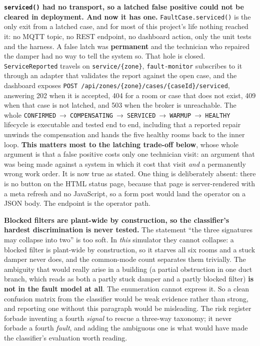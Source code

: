 \textbf{\texttt{serviced()} had no transport, so a latched false positive could not be cleared in
deployment. And now it has one.} \texttt{FaultCase.serviced()} is the only exit from a latched
case, and for most of this project's life nothing reached it: no MQTT topic, no REST endpoint, no
dashboard action, only the unit tests and the harness. A false latch was \textbf{permanent} and the
technician who repaired the damper had no way to tell the system so. That hole is closed.
\texttt{ServiceReported} travels on \texttt{service/\{zone\}}, \texttt{fault-monitor} subscribes to
it through an adapter that validates the report against the open case, and the dashboard exposes
\texttt{POST /api/zones/\allowbreak \{zone\}/cases/\allowbreak \{caseId\}/serviced}, answering 202 when it is accepted, 404
for a room or case that does not exist, 409 when that case is not latched, and 503 when the broker
is unreachable. The whole
\texttt{CONFIRMED}~→~\texttt{COMPENSATING}~→~\texttt{SERVICED}~→~\texttt{WARMUP}~→~\texttt{HEALTHY}
lifecycle is executable and tested end to end, including that a reported repair unwinds the
compensation and hands the five healthy rooms back to the inner loop. \textbf{This matters most to
the latching trade-off below}, whose whole argument is that a false positive costs only one
technician visit: an argument that was being made against a system in which it cost that visit
\emph{and} a permanently wrong work order. It is now true as stated. One thing is deliberately
absent: there is no button on the HTML status page, because that page is server-rendered with a
meta refresh and no JavaScript, so a form post would land the operator on a JSON body. The endpoint
is the operator path.

\textbf{Blocked filters are plant-wide by construction, so the classifier's hardest discrimination
is never tested.} The statement ``the three signatures may collapse into two'' is too soft. In
\emph{this} simulator they cannot collapse: a blocked filter is plant-wide by construction, so it
starves all six rooms and a stuck damper never does, and the common-mode count separates them
trivially. The ambiguity that would really arise in a building (a partial obstruction in one duct
branch, which reads as both a partly stuck damper and a partly blocked filter) \textbf{is not in
the fault model at all}. The enumeration cannot express it. So a clean confusion matrix from the
classifier would be weak evidence rather than strong, and reporting one without this paragraph
would be misleading. The risk register forbade inventing a fourth \emph{signal} to rescue a
three-way taxonomy; it never forbade a fourth \emph{fault}, and adding the ambiguous one is what
would have made the classifier's evaluation worth reading.

